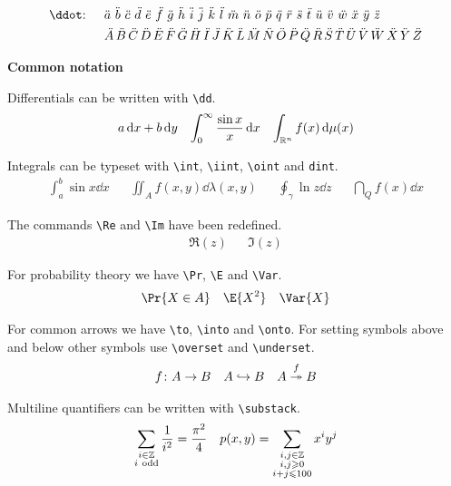 \documentclass{myassignment}
\begin{document}
\begin{align*}
    &\text{\texttt{\textbackslash ddot}: } &&\ddot{a}\,\,\ddot{b}\,\,\ddot{c}\,\,\ddot{d}\,\,\ddot{e}\,\,\ddot{f}\,\,\ddot{g}\,\,\ddot{h}\,\,\ddot{i}\,\,\ddot{j}\,\,\ddot{k}\,\,\ddot{l}\,\,\ddot{m}\,\,\ddot{n}\,\,\ddot{o}\,\,\ddot{p}\,\,\ddot{q}\,\,\ddot{r}\,\,\ddot{s}\,\,\ddot{t}\,\,\ddot{u}\,\,\ddot{v}\,\,\ddot{w}\,\,\ddot{x}\,\,\ddot{y}\,\,\ddot{z} \\
    &&&\ddot{A}\,\ddot{B}\,\ddot{C}\,\ddot{D}\,\ddot{E}\,\ddot{F}\,\ddot{G}\,\ddot{H}\,\ddot{I}\,\ddot{J}\,\ddot{K}\,\ddot{L}\,\ddot{M}\,\ddot{N}\,\ddot{O}\,\ddot{P}\,\ddot{Q}\,\ddot{R}\,\ddot{S}\,\ddot{T}\,\ddot{U}\,\ddot{V}\,\ddot{W}\,\ddot{X}\,\ddot{Y}\,\ddot{Z}
\end{align*}

\newpage

\textbf{Common notation}

Differentials can be written with \verb|\dd|.
\begin{align*}
    a\mathop{}\!\mathrm{d} x + b\mathop{}\!\mathrm{d} y && \int_0^\infty \frac{\sin x}{x} \mathop{}\!\mathrm{d} x && \int_{\mathbb{R}^n} f(x) \mathop{}\!\mathrm{d} \mu(x)
\end{align*}

Integrals can be typeset with \verb|\int|, \verb|\iint|, \verb|\oint| and \verb|dint|.
\begin{align*}
    \int_a^b \sin x \dd x && \iint_A f(x, y) \dd \lambda(x, y) && \oint_\gamma \ln z \dd z && \dint_Q f(x) \dd x
\end{align*}

The commands \verb|\Re| and \verb|\Im| have been redefined.
\begin{align*}
    \Re(z) && \Im(z)
\end{align*}

For probability theory we have \verb|\Pr|, \verb|\E| and \verb|\Var|.
\begin{align*}
    \Pr{X \in A} && \E{X^2} && \Var{X}
\end{align*}

For common arrows we have \verb|\to|, \verb|\into| and \verb|\onto|. For setting symbols above and below other symbols use \verb|\overset| and \verb|\underset|.
\begin{align*}
    f \colon A \to B && A \hookrightarrow B && A \overset{f}{\twoheadrightarrow} B
\end{align*}

Multiline quantifiers can be written with \verb|\substack|.
\begin{align*}
    \sum_{\substack{i \in \mathbb{Z} \\ i~\text{odd}}} \frac{1}{i^2} = \frac{\pi^2}{4} && p(x, y) = \sum_{\substack{i, j \in \mathbb{Z} \\ i, j \geqslant 0 \\ i + j \leqslant 100}} x^i y^j
\end{align*}
\end{document}
